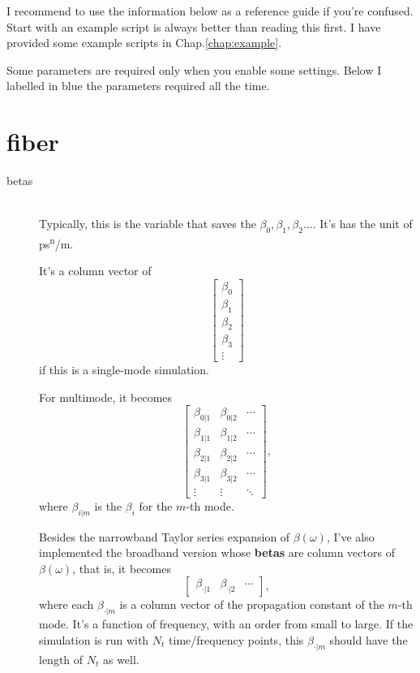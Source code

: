 \documentclass[12pt,hidelinks]{book}
\begin{document}
I recommend to use the information below as a reference guide if you're confused. Start with an example script is always better than reading this first. I have provided some example scripts in Chap.\ref{chap:example}.

Some parameters are required only when you enable some settings. Below I labelled in blue the parameters required all the time.

\section{fiber}
\begin{description}
\item[\color{blue}betas]\mbox{}\\
Typically, this is the variable that saves the $\beta_0, \beta_1, \beta_2\ldots$. It's has the unit of \si{ps^n/m}.

It's a column vector of
\begin{equation}
\begin{bmatrix}
\beta_0 \\ \beta_1 \\ \beta_2 \\ \beta_3 \\ \vdots
\end{bmatrix}
\end{equation}
if this is a single-mode simulation.

For multimode, it becomes
\begin{equation}
\begin{bmatrix}
\beta_{0|1} & \beta_{0|2} & \cdots \\ \beta_{1|1} & \beta_{1|2} & \cdots \\ \beta_{2|1} & \beta_{2|2} & \cdots \\ \beta_{3|1} & \beta_{3|2} & \cdots \\ \vdots & \vdots & \ddots
\end{bmatrix},
\end{equation}
where $\beta_{i|m}$ is the $\beta_i$ for the $m$-th mode.

Besides the narrowband Taylor series expansion of $\beta(\omega)$, I've also implemented the broadband version whose {\bfseries betas} are column vectors of $\beta(\omega)$, that is, it becomes
\begin{equation}
\begin{bmatrix}
\beta_{\cdot|1} & \beta_{\cdot|2} & \cdots
\end{bmatrix},
\end{equation}
where each $\beta_{\cdot|m}$ is a column vector of the propagation constant of the $m$-th mode. It's a function of frequency, with an order from small to large. If the simulation is run with $N_t$ time/frequency points, this $\beta_{\cdot|m}$ should have the length of $N_t$ as well.


\end{description}
\end{document}
